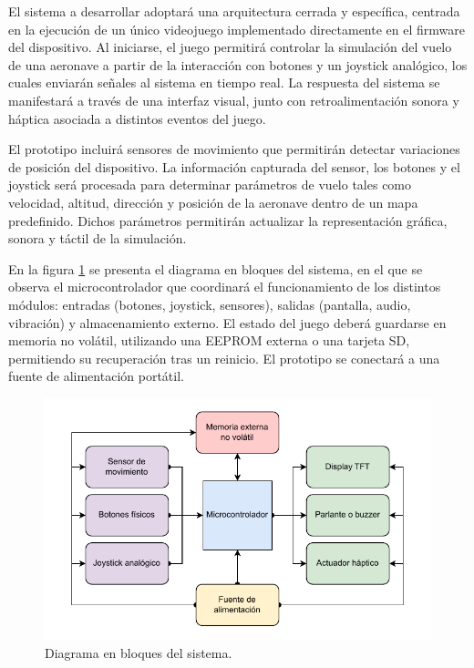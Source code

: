 \documentclass[
11pt, %
]{charter}
\begin{document}
El sistema a desarrollar adoptará una arquitectura cerrada y específica, centrada en la ejecución de un único videojuego implementado directamente en el firmware del dispositivo. Al iniciarse, el juego permitirá controlar la simulación del vuelo de una aeronave a partir de la interacción con botones y un joystick analógico, los cuales enviarán señales al sistema en tiempo real. La respuesta del sistema se manifestará a través de una interfaz visual, junto con retroalimentación sonora y háptica asociada a distintos eventos del juego.

El prototipo incluirá sensores de movimiento que permitirán detectar variaciones de posición del dispositivo. La información capturada del sensor, los botones y el joystick será procesada para determinar parámetros de vuelo tales como velocidad, altitud, dirección y posición de la aeronave dentro de un mapa predefinido. Dichos parámetros permitirán actualizar la representación gráfica, sonora y táctil de la simulación. 

En la figura \ref{fig:diagBloques} se presenta el diagrama en bloques del sistema, en el que se observa el microcontrolador que coordinará el funcionamiento de los distintos módulos: entradas (botones, joystick, sensores), salidas (pantalla, audio, vibración) y almacenamiento externo. El estado del juego deberá guardarse en memoria no volátil, utilizando una EEPROM externa o una tarjeta SD, permitiendo su recuperación tras un reinicio. El prototipo se conectará a una fuente de alimentación portátil.

\begin{figure}[htpb]
\centering 
\includegraphics[width=.85\textwidth]{./Figuras/diagrama_bloques_proyecto.pdf}
\caption{Diagrama en bloques del sistema.}
\label{fig:diagBloques}
\end{figure}
\end{document}
